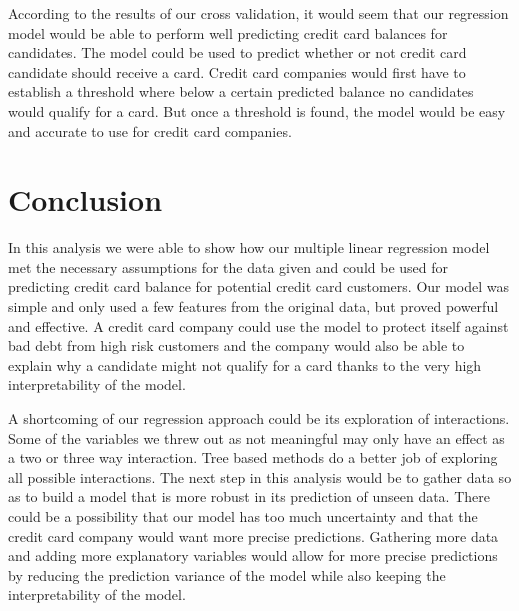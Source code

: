 \documentclass{article}
\begin{document}
According to the results of our cross validation, it would seem that our regression model would be able to perform well predicting credit card balances for candidates. The model could be used to predict whether or not credit card candidate should receive a card. Credit card companies would first have to establish a threshold where below a certain predicted balance no candidates would qualify for a card. But once a threshold is found, the model would be easy and accurate to use for credit card companies.

\section{Conclusion}
In this analysis we were able to show how our multiple linear regression model met the necessary assumptions for the data given and could be used for predicting credit card balance for potential credit card customers. Our model was simple and only used a few features from the original data, but proved powerful and effective. A credit card company could use the model to protect itself against bad debt from high risk customers and the company would also be able to explain why a candidate might not qualify for a card thanks to the very high interpretability of the model.

A shortcoming of our regression approach could be its exploration of interactions. Some of the variables we threw out as not meaningful may only have an effect as a two or three way interaction. Tree based methods do a better job of exploring all possible interactions. The next step in this analysis would be to gather data so as to build a model that is more robust in its prediction of unseen data. There could be a possibility that our model has too much uncertainty and that the credit card company would want more precise predictions. Gathering more data and adding more explanatory variables would allow for more precise predictions by reducing the prediction variance of the model while also keeping the interpretability of the model. 
\end{document}
